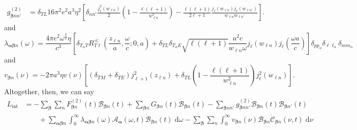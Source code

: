\documentclass{article}
\begin{document}
\begin{equation}
\begin{split}
g_{\bm{\beta}nn'}^{(2)} 
&= \delta_{TL}16\pi^2e^2a^3\eta^2\left[\delta_{nn'}\frac{j_\ell^2(w_{\ell n})}{2}\left(1 - \frac{\ell(\ell + 1)}{w_{\ell n}^2}\right) - \frac{\ell(\ell + 1)}{2\ell + 1}\frac{j_\ell(w_{\ell n})j_\ell(w_{\ell n'})}{w_{\ell n}w_{\ell n'}}\right].
\end{split}
\end{equation}
and
\begin{equation}
\lambda_{\bm{\alpha}\bm{\beta}n}(\omega) = \frac{4\pi e^2\omega^\frac{3}{2}\eta}{c^3}\left[\delta_{T_\alpha T}R_{T\ell}^\ll\left(\frac{z_{\ell n}}{a},\frac{\omega}{c};0,a\right) + \delta_{TL}\delta_{T_\alpha E}\sqrt{\ell(\ell+1)}\frac{a^2c}{w_{\ell n}\omega}j_\ell(w_{\ell n})j_{\ell}\left(\frac{\omega a}{c}\right)\right]\delta_{pp_\alpha}\delta_{\ell\ell_\alpha}\delta_{mm_\alpha}
\end{equation}
and
\begin{equation}
v_{\bm{\beta}n}(\nu) = -2\pi a^3\eta v(\nu)\left[(\delta_{TM} + \delta_{TE})j_{\ell + 1}^2(z_{\ell n}) + \delta_{TL}\left(1 - \frac{\ell(\ell + 1)}{w_{\ell n}^2}\right)j_\ell^2(w_{\ell n})\right].
\end{equation}
Altogether, then, we can say
\begin{equation}
\begin{split}
L_\mathrm{int} &= -\sum_{\bm{\beta}}\sum_{n}F_{\bm{\beta}n}^{(2)}(t)\mathcal{B}_{\bm{\beta}n}(t) + \sum_{\bm{\beta}n}G_{\bm{\beta}n}(t)\dot{\mathcal{B}}_{\bm{\beta}n}(t) - \sum_{\bm{\beta}nn'}g_{\bm{\beta}nn'}^{(2)}\mathcal{B}_{\bm{\beta}n}(t)\mathcal{B}_{\bm{\beta}n'}(t)\\
&\qquad + \sum_{\bm{\alpha}\bm{\beta}n}\int_0^\infty\lambda_{\bm{\alpha}\bm{\beta}n}(\omega)\mathcal{A}_{\bm{\alpha}}(\omega,t)\dot{\mathcal{B}}_{\bm{\beta}n}(t)\;\mathrm{d}\omega - \sum_{\bm{\beta}}\sum_{n}\int_0^\infty v_{\bm{\beta}n}(\nu)\mathcal{B}_{\bm{\beta}n}\dot{\mathcal{C}}_{\bm{\beta}n}(\nu,t)\;\mathrm{d}\nu
\end{split}
\end{equation}
\end{document}
